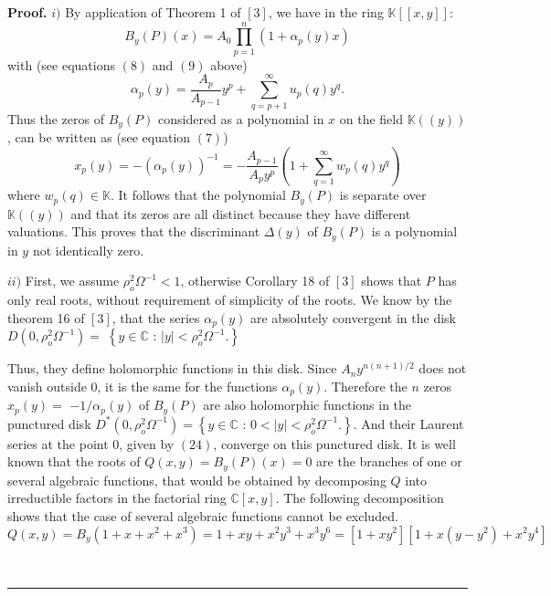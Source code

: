 \documentclass{article}
\newenvironment{proof}[1][Proof]{\textbf{#1.} }{\ \rule{0.5em}{0.5em}}
\begin{document}
\begin{proof}
\bigskip $i)$ By application of Theorem 1 of $\left[ 3\right] $, we have in
the ring $\mathbb{K}\left[ \left[ x,y\right] \right] $: 
\begin{equation*}
B_{y}\left( P\right) \left( x\right) =A_{0}\prod\limits_{p=1}^{n}\left(
1+\alpha _{p}\left( y\right) x\right) 
\end{equation*}
with (see equations $\left( 8\right) $ and $\left( 9\right) $ above) 
\begin{equation}
\alpha _{p}\left( y\right) =\dfrac{A_{p}}{A_{p-1}}y^{p}+\sum\limits_{q=p+1}^{\infty }u_{p}\left( q\right) y^{q}\text{.}
\end{equation}
Thus the zeros of $B_{y}\left( P\right) $ considered as a polynomial in $x$
on the field $\mathbb{K}\left( \left( y\right) \right) $, can be written as
(see equation $\left( 7\right) $) 
\begin{equation}
x_{p}\left( y\right) =-\left( \alpha _{p}\left( y\right) \right) ^{-1}=-\dfrac{A_{p-1}}{A_{p}y^{p}}\left( 1+\sum\limits_{q=1}^{\infty }w_{p}\left(
q\right) y^{q}\right) 
\end{equation}
where $w_{p}\left( q\right) \in \mathbb{K}$. It follows that the polynomial $B_{y}\left( P\right) $ is separate over $\mathbb{K}\left( \left( y\right)
\right) $ and that its zeros are all distinct because they have different
valuations. This proves that the discriminant $\Delta \left( y\right) $ of $B_{y}\left( P\right) $ is a polynomial in $y$ not identically zero.

$ii)$ First, we assume $\rho _{o}^{2}\Omega ^{-1}<1$, otherwise Corollary 18
of $\left[ 3\right] $ shows that $P$ has only real roots, without
requirement of simplicity of the roots. We know by the theorem 16 of $\left[
3\right] $, that the series $\alpha _{p}\left( y\right) $ are absolutely
convergent in the disk $D\left( 0,\rho _{o}^{2}\Omega ^{-1}\right)
=\;\left\{ y\in \mathbb{C}\text{ : }\left| y\right| <\rho _{o}^{2}\Omega
^{-1}.\right\} $

Thus, they define holomorphic functions in this disk. Since $A_{n}y^{n\left(
n+1\right) /2}$ does not vanish outside $0$, it is the same for the
functions $\alpha _{p}\left( y\right) $. Therefore the $n$ zeros $x_{p}\left( y\right) =$ $-1/\alpha _{p}\left( y\right) $ of $B_{y}\left(
P\right) $ are also holomorphic functions in the punctured disk $D^{\ast
}\left( 0,\rho _{o}^{2}\Omega ^{-1}\right) =\left\{ y\in \mathbb{C}\text{ : }0<\left| y\right| <\rho _{o}^{2}\Omega ^{-1}.\right\} $. And their Laurent
series at the point $0$, given by $\left( 24\right) $, converge on this
punctured disk. It is well known that the roots of $Q\left( x,y\right)
=B_{y}\left( P\right) \left( x\right) =0$ are the branches of one or several
algebraic functions, that would be obtained by decomposing $Q$ into
irreductible factors in the factorial ring $\mathbb{C}\left[ x,y\right] .$
The following decomposition shows that the case of several algebraic
functions cannot be excluded. 
\begin{equation*}
Q\left( x,y\right) =B_{y}\left( 1+x+x^{2}+x^{3}\right)
=1+xy+x^{2}y^{3}+x^{3}y^{6}=\left[ 1+xy^{2}\right] \left[ 1+x\left(
y-y^{2}\right) +x^{2}y^{4}\right] 
\end{equation*}


\end{proof}
\end{document}
